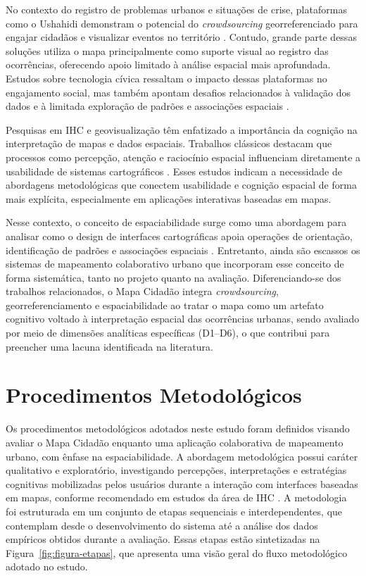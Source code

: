 \documentclass[12pt]{article}
\begin{document}
No contexto do registro de problemas urbanos e situações de crise, plataformas como o Ushahidi demonstram o potencial do \textit{crowdsourcing} georreferenciado para engajar cidadãos e visualizar eventos no território \cite{meier:2015}. Contudo, grande parte dessas soluções utiliza o mapa principalmente como suporte visual ao registro das ocorrências, oferecendo apoio limitado à análise espacial mais aprofundada. Estudos sobre tecnologia cívica ressaltam o impacto dessas plataformas no engajamento social, mas também apontam desafios relacionados à validação dos dados e à limitada exploração de padrões e associações espaciais \cite{gonzaga:2025}.

Pesquisas em IHC e geovisualização têm enfatizado a importância da cognição na interpretação de mapas e dados espaciais. Trabalhos clássicos destacam que processos como percepção, atenção e raciocínio espacial influenciam diretamente a usabilidade de sistemas cartográficos \cite{slocum2001cognitive,montello2009cognitive}. Esses estudos indicam a necessidade de abordagens metodológicas que conectem usabilidade e cognição espacial de forma mais explícita, especialmente em aplicações interativas baseadas em mapas.

Nesse contexto, o conceito de espaciabilidade surge como uma abordagem para analisar como o design de interfaces cartográficas apoia operações de orientação, identificação de padrões e associações espaciais \cite{neto:ihc}. Entretanto, ainda são escassos os sistemas de mapeamento colaborativo urbano que incorporam esse conceito de forma sistemática, tanto no projeto quanto na avaliação. Diferenciando-se dos trabalhos relacionados, o Mapa Cidadão integra \textit{crowdsourcing}, georreferenciamento e espaciabilidade ao tratar o mapa como um artefato cognitivo voltado à interpretação espacial das ocorrências urbanas, sendo avaliado por meio de dimensões analíticas específicas (D1–D6), o que contribui para preencher uma lacuna identificada na literatura.


\section{Procedimentos Metodológicos}
Os procedimentos metodológicos adotados neste estudo foram definidos visando 
avaliar o Mapa Cidadão enquanto uma aplicação colaborativa de mapeamento urbano, com ênfase na espaciabilidade. A abordagem metodológica possui caráter qualitativo e exploratório, investigando percepções, interpretações e estratégias cognitivas mobilizadas pelos usuários durante a interação com interfaces baseadas em mapas, conforme recomendado em estudos da área de IHC \cite{silveira:2024}. A metodologia foi estruturada em um conjunto de etapas sequenciais e interdependentes, que contemplam desde o desenvolvimento do sistema até a análise dos dados empíricos obtidos durante a avaliação. Essas etapas estão sintetizadas na Figura~\ref{fig:figura-etapas}, que apresenta uma visão geral do fluxo metodológico adotado no estudo.
\end{document}

